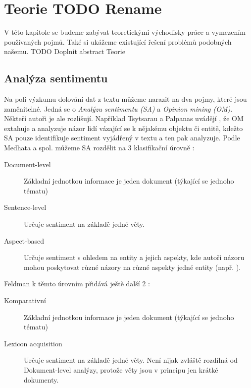 \chapter{Teorie TODO Rename}

\begin{chapterabstract}
	V této kapitole se budeme zabývat teoretickými východisky práce a vymezením používaných pojmů.
	 Také si ukážeme existující řešení problémů podobných našemu.
	 TODO Doplnit abstract Teorie
\end{chapterabstract}

\section{Analýza sentimentu}
Na poli výzkumu dolování dat z textu můžeme narazit na dva pojmy, které jsou zaměnitelné. Jedná se o \textit{Analýzu sentimentu (SA)} a \textit{Opinion mining (OM)}. \cite{Medhat} Někteří autoři je ale rozlišují. Například Tsytsarau a Palpanas uvádějí \cite{survey}, že OM extahuje a analyzuje názor lidí vázající se k nějakému objektu či entitě, kdežto SA pouze identifikuje sentiment vyjádřený v textu a ten pak analyzuje. 
Podle Medhata a spol. můžeme SA rozdělit na 3 klasifikační úrovně \cite{Medhat}:
\begin{description}
	\item[Document-level] Základní jednotkou informace je jeden dokument (týkající se jednoho tématu)
	
	\item[Sentence-level] Určuje sentiment na základě jedné věty.
	
	\item[Aspect-based] Určuje sentiment s ohledem na entity a jejich aspekty, kde autoři názoru mohou poskytovat různé názory na různé aspekty jedné entity (např. ).
\end{description}

Feldman k těmto úrovním přidává ještě další 2 \cite{Feldman}:
\begin{description}
	\item[Komparativní] Základní jednotkou informace je jeden dokument (týkající se jednoho tématu)
	
	\item[Lexicon acquisition] Určuje sentiment na základě jedné věty. Není nijak zvláště rozdílná od Dokument-level analýzy, protože věty jsou v principu jen krátké dokumenty. 
	
\end{description}

